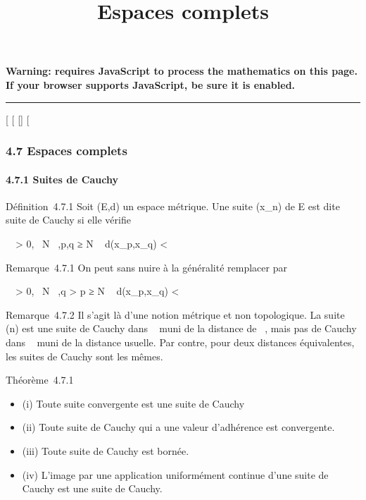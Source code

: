 \documentclass[]{article}
\title{Espaces complets}
\author{}
\date{}
\begin{document}
\maketitle

\textbf{Warning: 
requires JavaScript to process the mathematics on this page.\\ If your
browser supports JavaScript, be sure it is enabled.}

\begin{center}\rule{3in}{0.4pt}\end{center}

{[}
{[}
{[}{]}
{[}

\subsubsection{4.7 Espaces complets}

\paragraph{4.7.1 Suites de Cauchy}

Définition~4.7.1 Soit (E,d) un espace métrique. Une suite (x\_n)
de E est dite suite de Cauchy si elle vérifie

\forall~~\epsilon \textgreater{} 0,
\exists~N \in {}~,\quad p,q ≥ N \rigtharrow~
d(x\_p,x\_q) \textless{} \epsilon

Remarque~4.7.1 On peut sans nuire à la généralité remplacer par

\forall~~\epsilon \textgreater{} 0,
\exists~N \in {}~,\quad q \textgreater{} p
≥ N \rigtharrow~ d(x\_p,x\_q) \textless{} \epsilon

Remarque~4.7.2 Il s'agit là d'une notion métrique et non topologique. La
suite (n) est une suite de Cauchy dans ~ muni de la distance de
\overline{}~, mais pas de Cauchy dans ~ muni de la
distance usuelle. Par contre, pour deux distances équivalentes, les
suites de Cauchy sont les mêmes.

Théorème~4.7.1

\begin{itemize}
\itemsep1pt\parskip0pt
\item
  (i) Toute suite convergente est une suite de Cauchy
\item
  (ii) Toute suite de Cauchy qui a une valeur d'adhérence est
  convergente.
\item
  (iii) Toute suite de Cauchy est bornée.
\item
  (iv) L'image par une application uniformément continue d'une suite de
  Cauchy est une suite de Cauchy.
\end{itemize}
\end{document}
